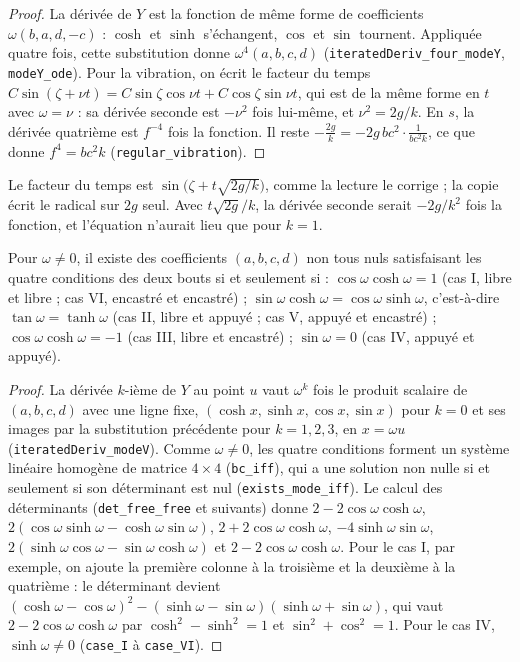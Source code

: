 \begin{proof}
La dérivée de $Y$ est la fonction de même forme de coefficients $\omega(b, a, d, -c)$ : $\cosh$ et $\sinh$ s'échangent, $\cos$ et $\sin$ tournent. Appliquée quatre fois, cette substitution donne $\omega^4(a,b,c,d)$ (\texttt{iteratedDeriv\_four\_modeY}, \texttt{modeY\_ode}). Pour la vibration, on écrit le facteur du temps $C\sin(\zeta + \nu t) = C\sin\zeta\cos\nu t + C\cos\zeta\sin\nu t$, qui est de la même forme en $t$ avec $\omega = \nu$ : sa dérivée seconde est $-\nu^2$ fois lui-même, et $\nu^2 = 2g/k$. En $s$, la dérivée quatrième est $f^{-4}$ fois la fonction. Il reste $-\frac{2g}{k} = -2g\,bc^2 \cdot \frac{1}{bc^2k}$, ce que donne $f^4 = bc^2k$ (\texttt{regular\_vibration}).
\end{proof}

\begin{remarque}
Le facteur du temps est $\sin\bigl(\zeta + t\sqrt{2g/k}\bigr)$, comme la lecture le corrige ; la copie écrit le radical sur $2g$ seul. Avec $t\sqrt{2g}/k$, la dérivée seconde serait $-2g/k^2$ fois la fonction, et l'équation n'aurait lieu que pour $k = 1$.
\end{remarque}

\begin{enonce}
Pour $\omega \neq 0$, il existe des coefficients $(a,b,c,d)$ non tous nuls satisfaisant les quatre conditions des deux bouts si et seulement si : $\cos\omega\cosh\omega = 1$ (cas I, libre et libre ; cas VI, encastré et encastré) ; $\sin\omega\cosh\omega = \cos\omega\sinh\omega$, c'est-à-dire $\tan\omega = \tanh\omega$ (cas II, libre et appuyé ; cas V, appuyé et encastré) ; $\cos\omega\cosh\omega = -1$ (cas III, libre et encastré) ; $\sin\omega = 0$ (cas IV, appuyé et appuyé).
\end{enonce}

\begin{proof}
La dérivée $k$-ième de $Y$ au point $u$ vaut $\omega^k$ fois le produit scalaire de $(a,b,c,d)$ avec une ligne fixe, $(\cosh x, \sinh x, \cos x, \sin x)$ pour $k = 0$ et ses images par la substitution précédente pour $k = 1, 2, 3$, en $x = \omega u$ (\texttt{iteratedDeriv\_modeV}). Comme $\omega \neq 0$, les quatre conditions forment un système linéaire homogène de matrice $4 \times 4$ (\texttt{bc\_iff}), qui a une solution non nulle si et seulement si son déterminant est nul (\texttt{exists\_mode\_iff}). Le calcul des déterminants (\texttt{det\_free\_free} et suivants) donne $2 - 2\cos\omega\cosh\omega$, $2(\cos\omega\sinh\omega - \cosh\omega\sin\omega)$, $2 + 2\cos\omega\cosh\omega$, $-4\sinh\omega\sin\omega$, $2(\sinh\omega\cos\omega - \sin\omega\cosh\omega)$ et $2 - 2\cos\omega\cosh\omega$. Pour le cas I, par exemple, on ajoute la première colonne à la troisième et la deuxième à la quatrième : le déterminant devient $(\cosh\omega - \cos\omega)^2 - (\sinh\omega - \sin\omega)(\sinh\omega + \sin\omega)$, qui vaut $2 - 2\cos\omega\cosh\omega$ par $\cosh^2 - \sinh^2 = 1$ et $\sin^2 + \cos^2 = 1$. Pour le cas IV, $\sinh\omega \neq 0$ (\texttt{case\_I} à \texttt{case\_VI}).
\end{proof}

